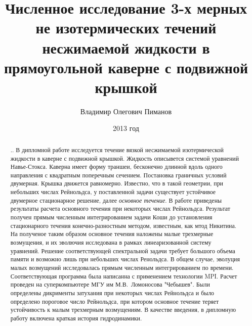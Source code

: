 \documentclass[a4paper,10pt]{article}
\title{Численное исследование 3-х мерных не изотермических течений несжимаемой жидкости в прямоугольной каверне с подвижной крышкой}
\author{Владимир Олегович Пиманов}
\date{2013 год}
\begin{document}

 \maketitle

\begin{abstract}..
  В дипломной работе исследуется течение вязкой несжимаемой изотермической жидкости в каверне с подвижной крышкой. 
  Жидкость описывется системой уравнений Навье-Стокса. Каверна имеет форму траншеи, бесконечно длинной 
  вдоль одного направления с квадратным поперечным сечением. Постановка граничных условий двумерная. 
  Крышка движется равномерно. Известно, что в такой геометрии, при небольших числах Рейнольдса, у поставленной задачи
  существует устойчивое двумерное стационарное решение, далее \textit{основное течение}. В работе приведены результаты
  расчета основного течения при некоторых числах Рейнольдса. Результат получен прямым численным интегрированием задачи 
  Коши до установления стационарного течения конечно-разностным методом, известным, как мтод Никитина. 
  На полученое таким образом основное течения наложены малые 
  трехмерные возмущения, и их эволючия исследована в рамках линеаризованной систему уравнений. Решение 
  соответствующей спектральной задачи требует большого объема памяти и возможно лишь при небольших числах Ренольдса.
  В общем случае, эволуция малых возмущений исследовалась прямым численным интегрированием по времени. 
  Соответствующая программа была написанна с применением технологии MPI. Расчет проведен на суперкомпьютере 
  МГУ им М.В.~Ломоносова "Чебышев". Были определены дикрименты затухания при некоторых числах Рейнольдса и было 
  определено пороговое число Рейнольдса, при котором основное течение теряет устойчивость к малым трехмерным возмущениям. 
  В качестве введения, в дипломную работу включена краткая история гидродинамики.
\end{abstract}
\newpage  

  
  
%  
  
  
%  
  
  
  
\end{document}
